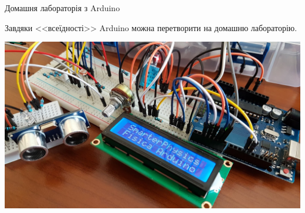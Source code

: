 \documentclass[9pt]{beamer}
\begin{document}
\begin{frame}{Домашня лабораторія з Arduino}{}
       \begin{block}{}
       Завдяки <<всеїдності>> Arduino можна перетворити на домашню лабораторію.
       \end{block}
    \begin{center}
        \includegraphics[width=\linewidth]{pictures/arduino_physics}
    \end{center}
\end{frame}
\end{document}
